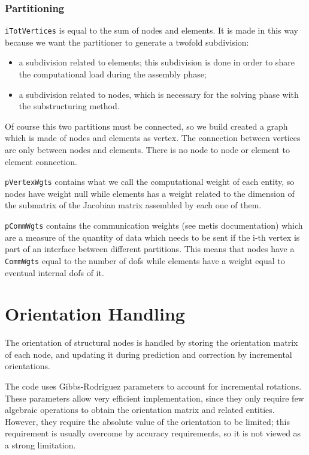 \documentclass[10pt,dvips,fleqn]{report}
\begin{document}
\subsection{Partitioning}
\texttt{iTotVertices} is equal to the sum of nodes and elements. 
It is made in this way because we want the partitioner 
to generate a twofold subdivision:
\begin{itemize}
\item a subdivision related to elements; 
this subdivision is done in order to share the computational 
load during the assembly phase;
\item a subdivision related to nodes, 
which is necessary for the solving phase with the substructuring method.
\end{itemize}
Of course this two partitions must be connected, 
so we build created a graph which is made of nodes and elements as vertex. 
The connection between vertices are only between nodes and elements. 
There is no node to node or element to element connection.

\texttt{pVertexWgts} 
contains what we call the computational weight of each entity, 
so nodes have weight null while elements has a weight related to 
the dimension of the submatrix of the Jacobian matrix assembled
by each one of them.

\texttt{pCommWgts} contains the communication weights 
(see metis documentation) which are a measure of the quantity 
of data which needs to be sent if the i-th vertex is part 
of an interface between different partitions. 
This means that nodes have a \texttt{CommWgts} equal to the number 
of dofs while elements have a weight equal to eventual internal dofs of it.


\chapter{Orientation Handling}
The orientation of structural nodes is handled by storing the orientation
matrix of each node, and updating it during prediction and correction 
by incremental orientations.

The code uses Gibbs-Rodriguez parameters to account for incremental 
rotations.
These parameters allow very efficient implementation, since they
only require few algebraic operations to obtain the orientation matrix
and related entities.
However, they require the absolute value of the orientation to be limited;
this requirement is usually overcome by accuracy requirements,
so it is not viewed as a strong limitation.
\end{document}
